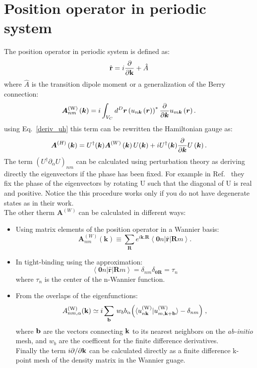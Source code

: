 \documentclass[preprint,showpacs,prb,superscriptaddress,aps,floatfix]{revtex4-1}
\newcommand{\bb}{{\bf b}}
\newcommand{\rr}{{\bf r}}
\newcommand{\kk}{{\bf k}}
\newcommand{\be}{\begin{equation}}
\newcommand{\ee}{\end{equation}}
\renewcommand{\[}{\left[}
\renewcommand{\]}{\right]}
\renewcommand{\(}{\left(}
\renewcommand{\)}{\right)}
\def\pw{^{({\rm W})}}
\begin{document}
\section{Position operator in periodic system}
The position operator in periodic system is defined as:\cite{blount1962solid}
\be
\hat \rr = i \frac{\partial}{\partial \kk} + \hat A
\ee
where $\hat A$ is the transition dipole moment or a generalization of the Berry connection:\cite{silva2019high,wang2006ab}
\be
\boldsymbol{A}\pw_{nm}\left(\boldsymbol{k}\right)=i\int_{V_{C}}d^{D}\boldsymbol{r}\left(u_{n\boldsymbol{k}}\left(\boldsymbol{r}\right)\right)^{*}\frac{\partial}{\partial\boldsymbol{k}}u_{m\boldsymbol{k}}\left(\boldsymbol{r}\right).
\ee
using Eq.~\ref{deriv_uh} this term can be rewritten the Hamiltonian gauge as:
\begin{equation}
\boldsymbol{A}^{\left(H\right)}\left(\boldsymbol{k}\right)=U^{\dagger}\text{\ensuremath{\left(\boldsymbol{k}\right)}}\boldsymbol{A}^{\left(W\right)}\left(\boldsymbol{k}\right)U\text{\ensuremath{\left(\boldsymbol{k}\right)}}+iU^{\dagger}\text{\ensuremath{\left(\boldsymbol{k}\right)}}\frac{\partial}{\partial\boldsymbol{k}}U\left(\boldsymbol{k}\right).
\end{equation}
The term $(U^{\dagger}\partial_{\alpha}U)_{nm}$ can be calculated using perturbation theory as deriving directly the eigenvectors if the phase has been fixed. For example in Ref.~ they fix the phase of the eigenvectors by rotating U such that the diagonal of U is real and positive. Notice the this procedure works only if you do not have degenerate states as in their work.\\
The other therm $\boldsymbol{A}^{\left(W\right)}$ can be calculated in different ways: 
\begin{itemize}
\item
Using matrix elements of the position operator in a Wannier basis:
\be
\boldsymbol{A}_{nm}^{(W)}\left(\boldsymbol{k}\right)  \equiv\sum_{\boldsymbol{R}}e^{i\boldsymbol{k}.\boldsymbol{R}}\left\langle \boldsymbol{0}n\left|\hat{\boldsymbol{r}}\right|\boldsymbol{R}m\right\rangle .\label{eq:Berry_connection_Wannier}
\ee
\item In tight-binding using the approximation:\cite{silva2019high}
\be
		\left\langle \boldsymbol{0}n\left|\hat{\boldsymbol{r}}\right|\boldsymbol{R}m\right\rangle=\delta_{nm}\delta_{\boldsymbol{0} \boldsymbol{R}} = \tau_n
\ee
where $\tau_n$ is the center of the n-Wannier function.
\item 
	From the overlaps of the eigenfunctions:\cite{wang2006ab}
	\begin{equation}
        A_{nm,\alpha}\pw(\kk)\simeq
        i\sum_\bb\,
        w_b b_{\alpha}\Big ( \langle u_{n\kk}\pw|u_{m,\kk+\bb}\pw
        \rangle
        - \delta_{nm}\Big )\;,
\label{eq:A_dis}
\end{equation}
%
where $\bb$ are the vectors connecting $\kk$ to its nearest
neighbors on the {\it ab-initio} mesh, and $w_b$ are the coefficent for the finite difference derivatives. \\
Finally the term  $i {\partial}/{\partial \kk}$ can be calculated directly as a finite difference k-point mesh of the density matrix in the Wannier guage.
\end{itemize}
\end{document}
